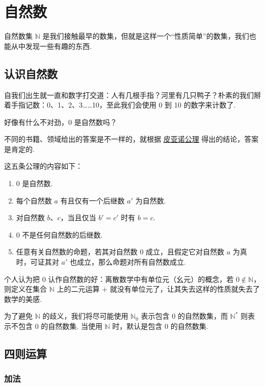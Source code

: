 \chapter{自然数} \label{chap:natural-number}

自然数集 $\mathbb{N}$ 是我们接触最早的数集，但就是这样一个“性质简单”的数集，我们也能从中发现一些有趣的东西.

\section{认识自然数} \label{sec:understand-natural-number}

自我们出生就一直和数字打交道：人有几根手指？河里有几只鸭子？朴素的我们掰着手指记数：0、1、2、3……10，至此我们会使用 0 到 10 的数字来计数了.

好像有什么不对劲，0 是自然数吗？

不同的书籍、领域给出的答案是不一样的，就根据 \href{https://zh.wikipedia.org/wiki/\%E7\%9A\%AE\%E4\%BA\%9A\%E8\%AF\%BA\%E5\%85\%AC\%E7\%90\%86}{皮亚诺公理} 得出的结论，答案是肯定的.

这五条公理的内容如下：

\begin{enumerate}
  \item 0 是自然数.
  \item 每个自然数 $a$ 有且仅有一个后继数 $a'$ 为自然数.
  \item 对自然数 $b$、$c$，当且仅当 $b' = c'$ 时有 $b = c$.
  \item 0 不是任何自然数的后继数.
  \item 任意有关自然数的命题，若其对自然数 0 成立，且假定它对自然数 $a$ 为真时，可证其对 $a'$ 也成立，那么命题对所有自然数成立.
\end{enumerate}

个人认为把 0 认作自然数的好：离散数学中有单位元（幺元）的概念，若 $0 \notin \mathbb{N}$，则定义在集合 $\mathbb{N}$ 上的二元运算 $+$ 就没有单位元了，让其失去这样的性质就失去了数学的美感.

为了避免 $\mathbb{N}$ 的歧义，我们将尽可能使用 $\mathbb{N}_0$ 表示包含 0 的自然数集，而 $\mathbb{N}^*$ 则表示不包含 0 的自然数集. 当使用 $\mathbb{N}$ 时，默认是包含 0 的自然数集.

\section{四则运算} \label{sec:four-arithmetic-operations}

\subsection{加法} \label{subsec:addition}

